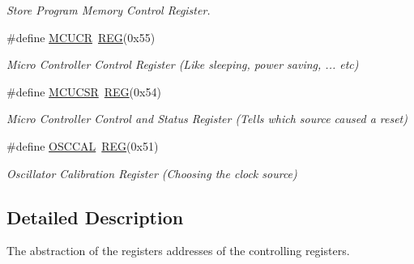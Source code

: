 \begin{DoxyCompactItemize}
\begin{DoxyCompactList}\small\item\em Store Program Memory Control Register. \end{DoxyCompactList}\item 
\hypertarget{group__MCUMCAL_ga1b5659537a1ba3f880a6e6cc6163d2cb}{\#define \hyperlink{group__MCUMCAL_ga1b5659537a1ba3f880a6e6cc6163d2cb}{M\+C\+U\+C\+R}~\hyperlink{group__MCAL_ga72e45020e46f285689db51c46f273403}{R\+E\+G}(0x55)}\label{group__MCUMCAL_ga1b5659537a1ba3f880a6e6cc6163d2cb}

\begin{DoxyCompactList}\small\item\em Micro Controller Control Register (Like sleeping, power saving, ... etc) \end{DoxyCompactList}\item 
\hypertarget{group__MCUMCAL_gab3032d9b747c08638c2a7ea0633c05e2}{\#define \hyperlink{group__MCUMCAL_gab3032d9b747c08638c2a7ea0633c05e2}{M\+C\+U\+C\+S\+R}~\hyperlink{group__MCAL_ga72e45020e46f285689db51c46f273403}{R\+E\+G}(0x54)}\label{group__MCUMCAL_gab3032d9b747c08638c2a7ea0633c05e2}

\begin{DoxyCompactList}\small\item\em Micro Controller Control and Status Register (Tells which source caused a reset) \end{DoxyCompactList}\item 
\hypertarget{group__MCUMCAL_ga1de4b6ba38e4166ef226c3c397843f69}{\#define \hyperlink{group__MCUMCAL_ga1de4b6ba38e4166ef226c3c397843f69}{O\+S\+C\+C\+A\+L}~\hyperlink{group__MCAL_ga72e45020e46f285689db51c46f273403}{R\+E\+G}(0x51)}\label{group__MCUMCAL_ga1de4b6ba38e4166ef226c3c397843f69}

\begin{DoxyCompactList}\small\item\em Oscillator Calibration Register (Choosing the clock source) \end{DoxyCompactList}\end{DoxyCompactItemize}


\subsection{Detailed Description}
The abstraction of the registers addresses of the controlling registers. 

